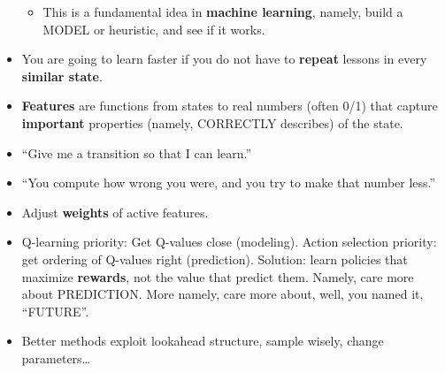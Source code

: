\documentclass[twocolumn]{article}
\begin{document}
\begin{itemize}
\begin{itemize}
  \item This is a fundamental idea in \textbf{machine learning},
    namely, build a MODEL or heuristic, and see if it works.
  \end{itemize}
\item You are going to learn faster if you do not have to
  \textbf{repeat} lessons in every \textbf{similar state}.
\item \textbf{Features} are functions from states to real numbers
  (often 0/1) that capture \textbf{important} properties (namely,
  CORRECTLY describes) of the state.
\item ``Give me a transition so that I can learn.''
\item ``You compute how wrong you were, and you try to make that
  number less.''
\item Adjust \textbf{weights} of active features.
\item Q-learning priority: Get Q-values close (modeling). Action
  selection priority: get ordering of Q-values right
  (prediction). Solution: learn policies that maximize
  \textbf{rewards}, not the value that predict them. Namely, care more
  about PREDICTION. More namely, care more about, well, you named it,
  ``FUTURE''.
\item Better methods exploit lookahead structure, sample wisely,
  change parameters\ldots
\end{itemize}
\end{document}
